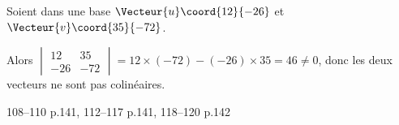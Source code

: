 \documentclass[a4paper]{article}
\begin{document}
\begin{example}{}{}

  Soient dans une base $\Vecteur{u}\coord{12}{-26}$ et $\Vecteur{v}\coord{35}{-72}$.

  Alors $\begin{vmatrix} 
    12 & 35 \\ 
    -26 & -72 
    \end{vmatrix} = 12\times(-72)-(-26)\times 35=46\neq 0$, donc les deux vecteurs ne sont pas colinéaires.
\end{example}

\begin{exercices}{}{}
  108--110 p.141, 112--117 p.141, 118--120 p.142
\end{exercices}


  
\end{document}
